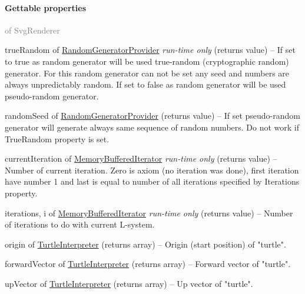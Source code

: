 	\paragraph{Gettable properties}\textcolor{gray}{of SvgRenderer}
	\begin{description*}
		\item[trueRandom] of \hyperref[Malsys.Processing.Components.Common.RandomGeneratorProvider]{RandomGeneratorProvider}
 \textit{run-time only} 		(returns value)
			-- If set to true as random generator will be used
            true-random (cryptographic random) generator.
            For this random generator can not be set any seed and numbers are
            always unpredictably random.
            If set to false as random generator will be used pseudo-random generator.
		\item[randomSeed] of \hyperref[Malsys.Processing.Components.Common.RandomGeneratorProvider]{RandomGeneratorProvider}
		(returns value)
			-- If set pseudo-random generator will generate always same sequence of random numbers.
            Do not work if TrueRandom property is set.
		\item[currentIteration] of \hyperref[Malsys.Processing.Components.RewriterIterators.MemoryBufferedIterator]{MemoryBufferedIterator}
 \textit{run-time only} 		(returns value)
			-- Number of current iteration. Zero is axiom (no iteration was done), first iteration have number 1
            and last is equal to number of all iterations specified by Iterations property.
		\item[iterations, i] of \hyperref[Malsys.Processing.Components.RewriterIterators.MemoryBufferedIterator]{MemoryBufferedIterator}
 \textit{run-time only} 		(returns value)
			-- Number of iterations to do with current L-system.
		\item[origin] of \hyperref[Malsys.Processing.Components.Interpreters.TurtleInterpreter]{TurtleInterpreter}
		(returns array)
			-- Origin (start position) of "turtle".
		\item[forwardVector] of \hyperref[Malsys.Processing.Components.Interpreters.TurtleInterpreter]{TurtleInterpreter}
		(returns array)
			-- Forward vector of "turtle".
		\item[upVector] of \hyperref[Malsys.Processing.Components.Interpreters.TurtleInterpreter]{TurtleInterpreter}
		(returns array)
			-- Up vector of "turtle".
	\end{description*}
